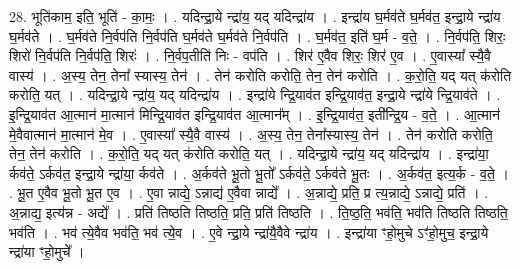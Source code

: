 \documentclass[17pt]{extarticle}
\begin{document}
28. भूति॑काम॒ इति॒ भूति॑ - का॒मः॒ । . यदिन्द्रा॒ये न्द्रा॑य॒ यद् यदिन्द्रा॑य । . इन्द्रा॑य घ॒र्मव॑ते घ॒र्मव॑त॒ इन्द्रा॒ये न्द्रा॑य घ॒र्मव॑ते । . घ॒र्मव॑ते नि॒र्वप॑ति नि॒र्वप॑ति घ॒र्मव॑ते घ॒र्मव॑ते नि॒र्वप॑ति । . घ॒र्मव॑त॒ इति॑ घ॒र्म - व॒ते॒ । . नि॒र्वप॑ति॒ शिरः॒ शिरो॑ नि॒र्वप॑ति नि॒र्वप॑ति॒ शिरः॑ । . नि॒र्वप॒तीति॑ निः - वप॑ति । . शिर॑ ए॒वैव शिरः॒ शिर॑ ए॒व । . ए॒वास्या᳚ स्यै॒वै वास्य॑ । . अ॒स्य॒ तेन॒ तेना᳚ स्यास्य॒ तेन॑ । . तेन॑ करोति करोति॒ तेन॒ तेन॑ करोति । . क॒रो॒ति॒ यद् यत् क॑रोति करोति॒ यत् । . यदिन्द्रा॒ये न्द्रा॑य॒ यद् यदिन्द्रा॑य । . इन्द्रा॑ये न्द्रि॒याव॑त इन्द्रि॒याव॑त॒ इन्द्रा॒ये न्द्रा॑ये न्द्रि॒याव॑ते । . इ॒न्द्रि॒याव॑त आ॒त्मान॑ मा॒त्मान॑ मिन्द्रि॒याव॑त इन्द्रि॒याव॑त आ॒त्मान᳚म् । . इ॒न्द्रि॒याव॑त॒ इती᳚न्द्रि॒य - व॒ते॒ । . आ॒त्मान॑ मे॒वैवात्मान॑ मा॒त्मान॑ मे॒व । . ए॒वास्या᳚ स्यै॒वै वास्य॑ । . अ॒स्य॒ तेन॒ तेना᳚स्यास्य॒ तेन॑ । . तेन॑ करोति करोति॒ तेन॒ तेन॑ करोति । . क॒रो॒ति॒ यद् यत् क॑रोति करोति॒ यत् । . यदिन्द्रा॒ये न्द्रा॑य॒ यद् यदिन्द्रा॑य । . इन्द्रा॑या॒ र्कव॑ते॒ ऽर्कव॑त॒ इन्द्रा॒ये न्द्रा॑या॒ र्कव॑ते । . अ॒र्कव॑ते भू॒तो भू॒तो᳚ ऽर्कव॑ते॒ ऽर्कव॑ते भू॒तः । . अ॒र्कव॑त॒ इत्य॒र्क - व॒ते॒ । . भू॒त ए॒वैव भू॒तो भू॒त ए॒व । . ए॒वा न्नाद्ये॒ ऽन्नाद्य॑ ए॒वैवा न्नाद्ये᳚ । . अ॒न्नाद्ये॒ प्रति॒ प्र त्य॒न्नाद्ये॒ ऽन्नाद्ये॒ प्रति॑ । . अ॒न्नाद्य॒ इत्य॑न्न - अद्ये᳚ । . प्रति॑ तिष्ठति तिष्ठति॒ प्रति॒ प्रति॑ तिष्ठति । . ति॒ष्ठ॒ति॒ भव॑ति॒ भव॑ति तिष्ठति तिष्ठति॒ भव॑ति । . भव॑ त्ये॒वैव भव॑ति॒ भव॑ त्ये॒व । . ए॒वे न्द्रा॒ये न्द्रा॑यै॒वैवे न्द्रा॑य । . इन्द्रा॑या ꣳहो॒मुचे ऽꣳ॑हो॒मुच॒ इन्द्रा॒ये न्द्रा॑या ꣳहो॒मुचे᳚ । \newline
\end{document}
